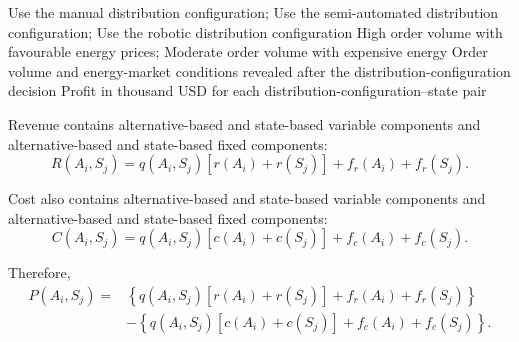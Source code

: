 	\DecisionElementsTable
	{Use the manual distribution configuration; Use the semi-automated distribution configuration; Use the robotic distribution configuration}
	{High order volume with favourable energy prices; Moderate order volume with expensive energy}
	{Order volume and energy-market conditions revealed after the distribution-configuration decision}
	{Profit in thousand USD for each distribution-configuration--state pair}

	Revenue contains alternative-based and state-based variable components and
	alternative-based and state-based fixed components:
	\[
	R(A_i,S_j)
	=
	q(A_i,S_j)
	\left[
	r(A_i)+r(S_j)
	\right]
	+
	f_r(A_i)
	+
	f_r(S_j).
	\]

	Cost also contains alternative-based and state-based variable components and
	alternative-based and state-based fixed components:
	\[
	C(A_i,S_j)
	=
	q(A_i,S_j)
	\left[
	c(A_i)+c(S_j)
	\right]
	+
	f_c(A_i)
	+
	f_c(S_j).
	\]

	Therefore,
	\[
	\begin{aligned}
		P(A_i,S_j)
		={}&
		\left\{
		q(A_i,S_j)
		\left[
		r(A_i)+r(S_j)
		\right]
		+
		f_r(A_i)
		+
		f_r(S_j)
		\right\}
		\\
		&-
		\left\{
		q(A_i,S_j)
		\left[
		c(A_i)+c(S_j)
		\right]
		+
		f_c(A_i)
		+
		f_c(S_j)
		\right\}.
	\end{aligned}
	\]


